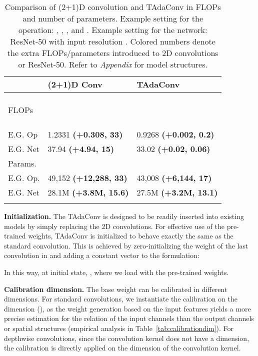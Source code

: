 \documentclass[10pt,journal,compsoc]{IEEEtran}
\newcommand{\tablestyle}[2]{\setlength{\tabcolsep}{#1}\renewcommand{\arraystretch}{#2}\centering\small}
\begin{document}
\begin{table}[b]
\caption{
Comparison of (2+1)D convolution and TAdaConv in FLOPs and number of parameters. 
Example setting for the operation: , , ,  and . 
Example setting for the network: ResNet-50 with input resolution .
Colored numbers denote the extra FLOPs/parameters introduced to 2D convolutions or ResNet-50.
Refer to \textit{Appendix} for model structures.
}
\centering
\tablestyle{3pt}{1.0}
\begin{tabular}{lll}
\shline
 ~& \textbf{(2+1)D Conv} & \textbf{TAdaConv} \\
\hline
\multirow{4}{*}{FLOPs} & ~ & \footnotesize   \\
~ & \footnotesize  & \footnotesize  \\
~ & \footnotesize  & \footnotesize  \\
 ~ & ~ & \footnotesize  \\
E.G. Op & 1.2331 {\footnotesize\color{bad}\textbf{(+0.308, 33)}} & 0.9268 {\footnotesize\color{forestgreen}\textbf{(+0.002, 0.2)}}\\
E.G. Net & 37.94 {\footnotesize\color{bad}\textbf{(+4.94, 15)}} & 33.02 {\footnotesize\color{forestgreen}\textbf{(+0.02, 0.06)}} \\
\hline
\multirow{2}{*}{Params.} & \footnotesize   & \footnotesize \\
~ & \footnotesize  & \footnotesize  \\

E.G. Op.& 49,152 {\footnotesize\color{bad}\textbf{(+12,288, 33)}} & 43,008 {\footnotesize\color{forestgreen}\textbf{(+6,144, 17)}}\\
E.G. Net & 28.1M {\footnotesize\color{bad}\textbf{(+3.8M, 15.6)}}& 27.5M {\footnotesize\color{forestgreen}\textbf{(+3.2M, 13.1)}}\\
\shline
\end{tabular}
\label{tab:temporalmodelingcomparison}
\end{table}

\textbf{Initialization. }The TAdaConv is designed to be readily inserted into existing models by simply replacing the 2D convolutions. 
For effective use of the pre-trained weights, TAdaConv is initialized to behave exactly the same as the standard convolution.
This is achieved by zero-initializing the weight of the last convolution in  and adding a constant vector  to the formulation:

\noindent In this way, at initial state, , where we load  with the pre-trained weights.

\textbf{Calibration dimension. }
The base weight  can be calibrated in different dimensions.
For standard convolutions, we instantiate the calibration on the  dimension (), as the weight generation based on the input features yields a more precise estimation for the relation of the input channels than the output channels or spatial structures (empirical analysis in Table~\ref{tab:calibrationdim}). For depthwise convolutions, since the convolution kernel does not have a  dimension, the calibration is directly applied on the  dimension of the convolution kernel.
\end{document}
